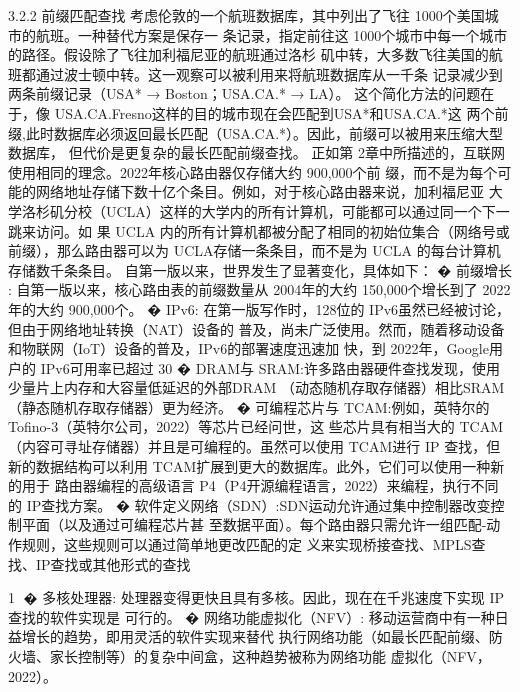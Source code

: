 
3.2.2 前缀匹配查找
考虑伦敦的一个航班数据库，其中列出了飞往 1000个美国城市的航班。一种替代方案是保存一
条记录，指定前往这 1000个城市中每一个城市的路径。假设除了飞往加利福尼亚的航班通过洛杉
矶中转，大多数飞往美国的航班都通过波士顿中转。这一观察可以被利用来将航班数据库从一千条
记录减少到两条前缀记录（USA* → Boston；USA.CA.* → LA）。
这个简化方法的问题在于，像 USA.CA.Fresno这样的目的城市现在会匹配到USA*和USA.CA.*这
两个前缀,此时数据库必须返回最长匹配（USA.CA.*）。因此，前缀可以被用来压缩大型数据库，
但代价是更复杂的最长匹配前缀查找。
正如第 2章中所描述的，互联网使用相同的理念。2022年核心路由器仅存储大约 900,000个前
缀，而不是为每个可能的网络地址存储下数十亿个条目。例如，对于核心路由器来说，加利福尼亚
大学洛杉矶分校（UCLA）这样的大学内的所有计算机，可能都可以通过同一个下一跳来访问。如
果 UCLA 内的所有计算机都被分配了相同的初始位集合（网络号或前缀），那么路由器可以为
UCLA存储一条条目，而不是为 UCLA 的每台计算机存储数千条条目。
自第一版以来，世界发生了显著变化，具体如下：
� 前缀增长 : 自第一版以来，核心路由表的前缀数量从 2004年的大约 150,000个增长到了
2022
年的大约 900,000个。
� IPv6: 在第一版写作时，128位的 IPv6虽然已经被讨论，但由于网络地址转换（NAT）设备的
普及，尚未广泛使用。然而，随着移动设备和物联网（IoT）设备的普及，IPv6的部署速度迅速加
快，到 2022年，Google用户的 IPv6可用率已超过 30%
� DRAM与 SRAM:许多路由器硬件查找发现，使用少量片上内存和大容量低延迟的外部DRAM
（动态随机存取存储器）相比SRAM（静态随机存取存储器）更为经济。
� 可编程芯片与 TCAM:例如，英特尔的 Tofino-3（英特尔公司，2022）等芯片已经问世，这
些芯片具有相当大的 TCAM（内容可寻址存储器）并且是可编程的。虽然可以使用 TCAM进行 IP
查找，但新的数据结构可以利用 TCAM扩展到更大的数据库。此外，它们可以使用一种新的用于
路由器编程的高级语言 P4（P4开源编程语言，2022）来编程，执行不同的 IP查找方案。
� 软件定义网络（SDN）:SDN运动允许通过集中控制器改变控制平面（以及通过可编程芯片甚
至数据平面）。每个路由器只需允许一组匹配-动作规则，这些规则可以通过简单地更改匹配的定
义来实现桥接查找、MPLS查找、IP查找或其他形式的查找

                                                     1
� 多核处理器: 处理器变得更快且具有多核。因此，现在在千兆速度下实现 IP查找的软件实现是
可行的。
� 网络功能虚拟化（NFV）: 移动运营商中有一种日益增长的趋势，即用灵活的软件实现来替代
执行网络功能（如最长匹配前缀、防火墙、家长控制等）的复杂中间盒，这种趋势被称为网络功能
虚拟化（NFV，2022）。



